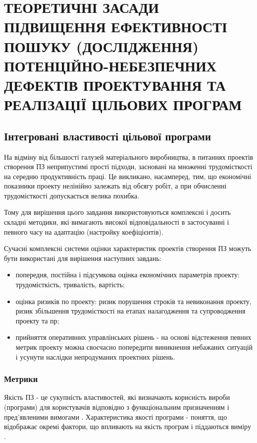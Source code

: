 \chapter{ТЕОРЕТИЧНІ ЗАСАДИ ПІДВИЩЕННЯ ЕФЕКТИВНОСТІ ПОШУКУ (ДОСЛІДЖЕННЯ) ПОТЕНЦІЙНО-НЕБЕЗПЕЧНИХ ДЕФЕКТІВ ПРОЕКТУВАННЯ ТА РЕАЛІЗАЦІЇ ЦІЛЬОВИХ ПРОГРАМ}
\label{2section::doc}\label{2section:id1}



\section{Інтегровані властивості цільової програми}
\label{2section:id2}
На відміну від більшості галузей матеріального виробництва, в питаннях проектів створення ПЗ неприпустимі прості підходи, засновані на множенні трудомісткості на середню продуктивність праці. Це викликано, насамперед, тим, що економічні показники проекту нелінійно залежать від обсягу робіт, а при обчисленні трудомісткості допускається велика похибка.

Тому для вирішення цього завдання використовуються комплексні і досить складні методики, які вимагають високої відповідальності в застосуванні і певного часу на адаптацію (настройку коефіцієнтів).

Сучасні комплексні системи оцінки характеристик проектів створення ПЗ можуть бути використані для вирішення наступних завдань:
\begin{itemize}
\item {} 
попередня, постійна і підсумкова оцінка економічних параметрів проекту: трудомісткість, тривалість, вартість;

\item {} 
оцінка ризиків по проекту: ризик порушення строків та невиконання проекту, ризик збільшення трудомісткості на етапах налагодження та супроводження проекту та пр;

\item {} 
прийняття оперативних управлінських рішень - на основі відстеження певних метрик проекту можна своєчасно попередити виникнення небажаних ситуацій і усунути наслідки непродуманих проектних рішень.

\end{itemize}


\subsection{Метрики}
\label{2section:id3}
Якість ПЗ - це сукупність властивостей, які визначають корисність вироби (програми) для користувачів відповідно з функціональним призначенням і пред'явленими вимогами .
Характеристика якості програми - поняття, що відображає окремі фактори, що впливають на якість програм і піддаються виміру .

